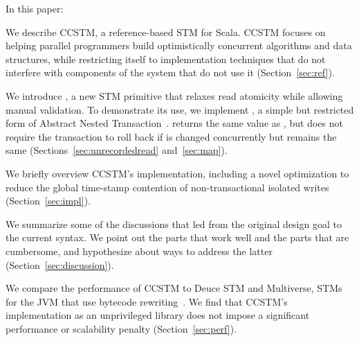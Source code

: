 In this paper:
\begin{packed_enum}

\item We describe CCSTM, a reference-based STM for Scala.  CCSTM focuses
on helping parallel programmers build optimistically concurrent algorithms
and data structures, while restricting itself to implementation techniques
that do not interfere with components of the system that do not use it
(Section~\ref{sec:ref}).

\item We introduce , a new STM primitive that relaxes
read atomicity while allowing manual validation.  To demonstrate its
use, we implement , a simple but restricted form of
Abstract Nested Transaction~\cite{harris07abstract}.  
returns the same value as , but does not require the
transaction to roll back if  is changed concurrently but
 remains the same (Sections~\ref{sec:unrecordedread}
and~\ref{sec:map}).

\item We briefly overview CCSTM's implementation, including a
novel optimization to reduce the global time-stamp contention of
non-transactional isolated writes (Section~\ref{sec:impl}).

\item We summarize some of the discussions that led from the original
design goal to the current syntax.  We point out the parts that work
well and the parts that are cumbersome, and hypothesize about ways to
address the latter (Section~\ref{sec:discussion}).

\item We compare the performance of CCSTM to Deuce STM and Multiverse,
STMs for the JVM that use bytecode rewriting~\cite{deucestm,multiverse}.
We find that CCSTM's implementation as an unprivileged library
does not impose a significant performance or scalability penalty
(Section~\ref{sec:perf}).

\end{packed_enum}

